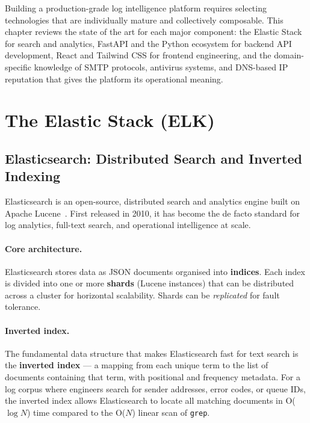 \documentclass[12pt,a4paper,oneside]{report}
\begin{document}
Building a production-grade log intelligence platform requires selecting technologies that are individually mature and collectively composable.
This chapter reviews the state of the art for each major component: the Elastic Stack for search and analytics, FastAPI and the Python ecosystem for backend API development, React and Tailwind CSS for frontend engineering, and the domain-specific knowledge of SMTP protocols, antivirus systems, and DNS-based IP reputation that gives the platform its operational meaning.

\section{The Elastic Stack (ELK)}

\subsection{Elasticsearch: Distributed Search and Inverted Indexing}

Elasticsearch is an open-source, distributed search and analytics engine built on Apache Lucene~\cite{elasticGuide}.
First released in 2010, it has become the de facto standard for log analytics, full-text search, and operational intelligence at scale.

\paragraph{Core architecture.}
Elasticsearch stores data as JSON documents organised into \textbf{indices}.
Each index is divided into one or more \textbf{shards} (Lucene instances) that can be distributed across a cluster for horizontal scalability.
Shards can be \emph{replicated} for fault tolerance.

\paragraph{Inverted index.}
The fundamental data structure that makes Elasticsearch fast for text search is the \textbf{inverted index} --- a mapping from each unique term to the list of documents containing that term, with positional and frequency metadata.
For a log corpus where engineers search for sender addresses, error codes, or queue IDs, the inverted index allows Elasticsearch to locate all matching documents in O($\log N$) time compared to the O($N$) linear scan of \texttt{grep}.
\end{document}
